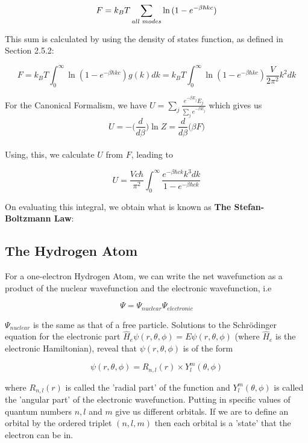 \documentclass[oneside]{book}
\begin{document}
\[ F =  k_BT\sum_{all \hspace{0.1cm} modes}^{}\ln{(1 - e^{-\beta \hbar kc})} \]

This sum is calculated by using the density of states function, as defined in Section 2.5.2:

\[ F =  k_BT\int_{0}^{\infty}\ln{(1 - e^{-\beta \hbar kc})g(k)dk} = k_BT\int_{0}^{\infty}\ln{(1 - e^{-\beta \hbar kc})\frac{V}{2\pi^2}k^2dk}  \]

For the Canonical Formalism, we have $U = \sum_{j}^{} \frac{e^{-\beta E_j}E_j}{\sum_{j}^{} e^{-\beta E_j}} $ which gives us \[ U = - \Big( \frac{d}{d\beta} \Big)\ln Z = \frac{d}{d\beta} \Big( \beta F \Big) \] \\

Using, this, we calculate $U$ from $F$, leading to

\[ U = \frac{Vc\hbar}{\pi^2} \int_{0}^{\infty}\frac{e^{-\beta \hbar c k }k^3dk}{1 - e^{-\beta \hbar ck}}  \]

On evaluating this integral, we obtain what is known as \textbf{The Stefan-Boltzmann Law}:\\

\begin{center}
\end{center}

\subsection{The Hydrogen Atom}
For a one-electron Hydrogen Atom, we can write the net wavefunction as a product of the nuclear wavefunction and the electronic wavefunction, i.e

\[ \Psi = \Psi_{nuclear}\Psi_{electronic}\]

$\Psi_{nuclear}$ is the same as that of a free particle. Solutions to the Schrödinger equation for the electronic part $\hat{H}_e\psi(r,\theta,\phi) = E\psi(r,\theta,\phi)$ (where 
$\hat{H}_e$ is the electronic Hamiltonian), reveal that $\psi(r,\theta,\phi)$ is of the form

\[ \psi(r,\theta,\phi) = R_{n,l}(r) \times Y_{l}^m(\theta,\phi) \]

where $R_{n,l}(r)$ is called the 'radial part' of the function and $Y_{l}^m(\theta,\phi)$ is called the 'angular part' of the electronic wavefunction. Putting in specific values of quantum numbers $n,l$ and $m$ give us different orbitals. If we are to define an orbital by the ordered triplet $(n,l,m)$ then each orbital is a 'state' that the electron can be in.\\
\end{document}
